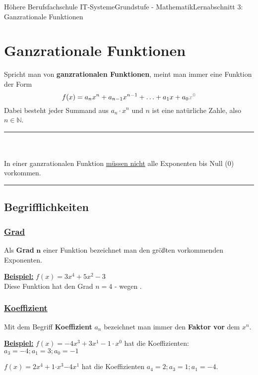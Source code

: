 \documentclass[11pt,twocolumn,oneside,openany,headings=optiontotoc,11pt,numbers=noenddot]{article}
\begin{document}
	\begin{worksheet}{Höhere Berufsfachschule IT-Systeme}{Grundstufe - Mathematik}{Lernabschnitt 3: Ganzrationale Funktionen}
		\setcounter{section}{5}
		\section{Ganzrationale Funktionen}
		Spricht man von \textbf{ganzrationalen Funktionen}, meint man immer eine Funktion der Form \[f(x) = a_nx^n + a_{n-1}x^{n-1} + \ldots + a_1x + a_0\color{codegray}{x^0}\] Dabei besteht jeder Summand aus \(a_n\cdot{}x^n\) und \(n\) ist eine natürliche Zahle, also \(n \in \mathbb{N}\).\\
		\par\noindent
		\rule{0.48\textwidth}{0.1pt}\\
		\underline{\color{red}{Vorsicht!}}\\
		In einer ganzrationalen Funktion \underline{müssen nicht} alle Exponenten bis Null (0) vorkommen.\\
		\rule{0.48\textwidth}{0.1pt}
		\subsection{Begrifflichkeiten}
		\subsubsection*{\underline{Grad}}
		Als \textbf{Grad} \(\mathbf{n}\) einer Funktion bezeichnet man den größten vorkommenden Exponenten.\\
		\par\noindent
		\textbf{\underline{Beispiel:}} \(f(x) = 3x^4 + 5x^2 -3\)\\
		Diese Funktion hat den Grad \(n = 4\) - wegen .
		\subsubsection*{\underline{Koeffizient}}
		Mit dem Begriff \textbf{Koeffizient} \(a_n\) bezeichnet man immer den \textbf{Faktor vor} dem \(x^n\).\\
		\par\noindent
		\underline{\textbf{Beispiel:}} \(f(x) = -4x^3 + 3x^{\mathit{1}} - 1\cdot{}\mathit{x^0}\) hat die Koeffizienten: \(a_3 = -4; a_1 = 3; a_0 = -1\)\\
		\par\noindent
		\(f(x) = \)\colorbox{green!10}{\(2\)}\(x^4 + \)\colorbox{green!10}{\(1\)}\(\cdot{}x^3 \)\colorbox{green!10}{\(- 4\)}\(x^{\mathit{1}}\) hat die Koeffizienten \(a_4 = 2; a_3 = 1; a_1 = -4\).

\end{worksheet}
\end{document}
